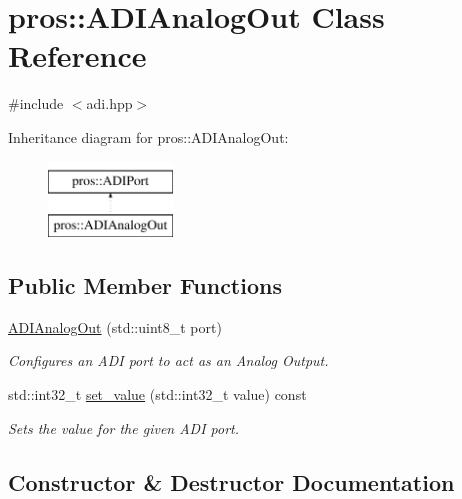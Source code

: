 \hypertarget{classpros_1_1ADIAnalogOut}{}\section{pros\+::A\+D\+I\+Analog\+Out Class Reference}
\label{classpros_1_1ADIAnalogOut}


{\ttfamily \#include $<$adi.\+hpp$>$}

Inheritance diagram for pros\+::A\+D\+I\+Analog\+Out\+:\begin{figure}[H]
\begin{center}
\leavevmode
\includegraphics[height=2.000000cm]{classpros_1_1ADIAnalogOut}
\end{center}
\end{figure}
\subsection*{Public Member Functions}
\begin{DoxyCompactItemize}
\item 
\mbox{\hyperlink{classpros_1_1ADIAnalogOut_a1758096961a060dea379bd696c293d26}{A\+D\+I\+Analog\+Out}} (std\+::uint8\+\_\+t port)
\begin{DoxyCompactList}\small\item\em Configures an A\+DI port to act as an Analog Output. \end{DoxyCompactList}\item 
std\+::int32\+\_\+t \mbox{\hyperlink{classpros_1_1ADIAnalogOut_ae6711117fbceb3bb6e3602c4ef63aff1}{set\+\_\+value}} (std\+::int32\+\_\+t value) const
\begin{DoxyCompactList}\small\item\em Sets the value for the given A\+DI port. \end{DoxyCompactList}\end{DoxyCompactItemize}


\subsection{Constructor \& Destructor Documentation}
\mbox{\label{classpros_1_1ADIAnalogOut_a1758096961a060dea379bd696c293d26}} 
